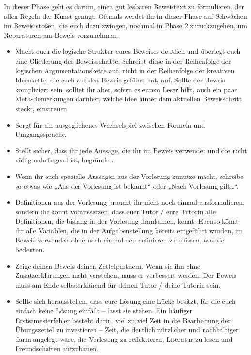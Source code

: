 \begin{phasethree}[Aufschreiben]\label{beweisaufschreiben}
    In dieser Phase geht es darum, einen gut lesbaren Beweistext zu formulieren, der allen Regeln der Kunst genügt. Oftmals werdet ihr in dieser Phase auf Schwächen im Beweis stoßen, die euch dazu zwingen, nochmal in Phase 2 zurückzugehen, um Reparaturen am Beweis vorzunehmen.
    \begin{itemize}
        \item Macht euch die logische Struktur eures Beweises deutlich und überlegt euch eine Gliederung der Beweisschritte. Schreibt diese in der Reihenfolge der logischen Argumentationskette auf, nicht in der Reihenfolge der kreativen Ideenkette, die euch auf den Beweis geführt hat, auf. Sollte der Beweis kompliziert sein, solltet ihr aber, sofern es eurem Leser hilft, auch ein paar Meta-Bemerkungen darüber, welche Idee hinter dem aktuellen Beweisschritt steckt, einstreuen.
        \item Sorgt für ein ausgeglichenes Wechselspiel zwischen Formeln und Umgangssprache.
        \item Stellt sicher, dass ihr jede Aussage, die ihr im Beweis verwendet und die nicht völlig naheliegend ist, begründet.
        \item Wenn ihr euch spezielle Aussagen aus der Vorlesung zunutze macht, schreibe so etwas wie „Aus der Vorlesung ist bekannt“ oder „Nach Vorlesung gilt\dots“.
        \item Definitionen aus der Vorlesung braucht ihr nicht noch einmal ausformulieren, sondern ihr könnt voraussetzen, dass euer Tutor / eure Tutorin alle Definitionen, die bislang in der Vorlesung drankamen, kennt. Ebenso könnt ihr alle Variablen, die in der Aufgabenstellung bereits eingeführt wurden, im Beweis verwenden ohne noch einmal neu definieren zu müssen, was sie bedeuten.
        \item Zeige deinen Beweis deinen Zettelpartnern. Wenn sie ihn ohne Zusatzerklärungen nicht verstehen, muss er verbessert werden. Der Beweis muss am Ende selbsterklärend für deinen Tutor / deine Tutorin sein.
        \item Sollte sich herausstellen, dass eure Lösung eine Lücke besitzt, für die euch einfach keine Lösung einfällt -- lasst sie stehen. Ein häufiger Erstsemesterfehler besteht darin, viel zu viel Zeit in die Bearbeitung der Übungszettel zu investieren -- Zeit, die deutlich nützlicher und nachhaltiger darin angelegt wäre, die Vorlesung zu reflektieren, Literatur zu lesen und Freundschaften aufzubauen.

\end{itemize}
\end{phasethree}
